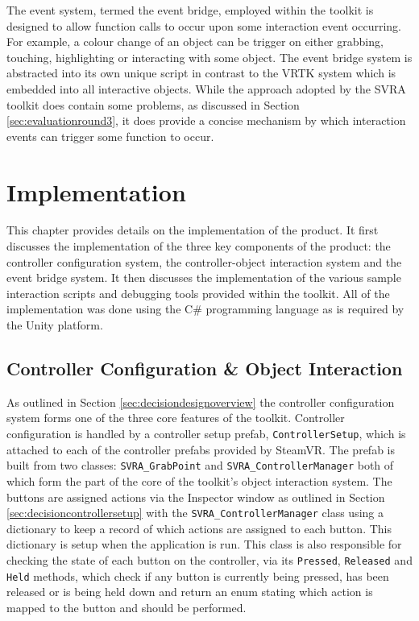 \documentclass{l4proj}
\begin{document}
The event system, termed the event bridge, employed within the toolkit is designed to allow function calls to occur upon some interaction event occurring. For example, a colour change of an object can be trigger on either grabbing,  touching, highlighting or interacting with some object. The event bridge system is abstracted into its own unique script in contrast to the VRTK system which is embedded into all interactive objects. While the approach adopted by the SVRA toolkit does contain some problems, as discussed in Section \ref{sec:evaluationround3}, it does provide a concise mechanism by which interaction events can trigger some function to occur. 

\chapter{Implementation}
\label{sec:implementationchapter}
This chapter provides details on the implementation of the product. It first discusses the implementation of the three key components of the product: the controller configuration system, the controller-object interaction system and the event bridge system. It then discusses the implementation of the various sample interaction scripts and debugging tools provided within the toolkit. All of the implementation was done using the C\# programming language as is required by the Unity platform.

\section{Controller Configuration \& Object Interaction}
\label{sec:implementationcontrollerconfiguration}
As outlined in Section \ref{sec:decisiondesignoverview} the controller configuration system forms one of the three core features of the toolkit. Controller configuration is handled by a controller setup prefab, \texttt{ControllerSetup}, which is attached to each of the controller prefabs provided by SteamVR. The prefab is built from two classes: \texttt{SVRA\_GrabPoint} and \texttt{SVRA\_ControllerManager} both of which form the part of the core of the toolkit's object interaction system. The buttons are assigned actions via the Inspector window as outlined in Section \ref{sec:decisioncontrollersetup} with the \texttt{SVRA\_ControllerManager} class using a dictionary to keep a record of which actions are assigned to each button. This dictionary is setup when the application is run. This class is also responsible for checking the state of each button on the controller, via its \texttt{Pressed}, \texttt{Released} and \texttt{Held} methods, which check if any button is currently being pressed, has been released or is being held down and return an enum stating which action is mapped to the button and should be performed.
\end{document}
